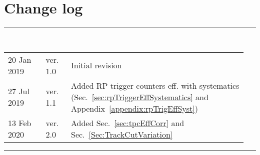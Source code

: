 \section*{\LARGE Change log}%
%
  \rule{\textwidth}{1.0pt}\\[5pt]%
  \begin{tabular}{>{\raggedright}p{0.15\linewidth}p{0.1\linewidth}p{0.7\linewidth}}
  	20 Jan 2019 & ver. 1.0 & Initial revision\\
  	27 Jul 2019 & ver. 1.1 & Added RP trigger counters eff. with systematics (Sec.~\ref{sec:rpTriggerEffSystematics} and Appendix~\ref{appendix:rpTrigEffSyst})\\
  	13 Feb 2020 & ver. 2.0 & Added Sec.~\ref{sec:tpcEffCorr} and Sec.~\ref{Sec:TrackCutVariation}
  \end{tabular}\newline%
 \rule{\textwidth}{1.0pt}
